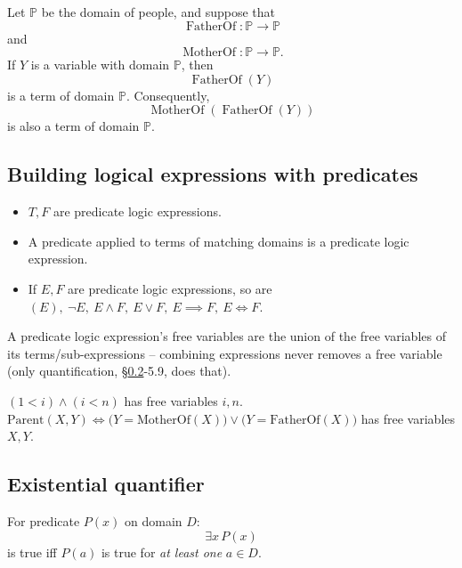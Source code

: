 \documentclass[11pt]{article}
\begin{document}
\begin{example}
Let $\mathbb P$ be the domain of people, and suppose that
\[
\operatorname{FatherOf}:\mathbb P\to\mathbb P
\]
and
\[
\operatorname{MotherOf}:\mathbb P\to\mathbb P.
\]
If $Y$ is a variable with domain $\mathbb P$, then
\[
\operatorname{FatherOf}(Y)
\]
is a term of domain $\mathbb P$. Consequently,
\[
\operatorname{MotherOf}(\operatorname{FatherOf}(Y))
\]
is also a term of domain $\mathbb P$.
\end{example}

\subsection{Building logical expressions with predicates}
\label{sec:5-5}

\begin{definition}
\begin{itemize}
    \item $T, F$ are predicate logic expressions.
    \item A predicate applied to terms of matching domains is a predicate logic expression.
    \item If $E,F$ are predicate logic expressions, so are $(E),\ \neg E,\ E\wedge F,\ E\vee F,\ E\implies F,\ E\iff F$.
\end{itemize}
\end{definition}

\begin{note}
A predicate logic expression's free variables are the union of the free variables of its terms/sub-expressions -- combining expressions never removes a free variable (only quantification, \S\ref{sec:5-6}-5.9, does that).
\end{note}

\begin{example}
$(1<i)\wedge(i<n)$ has free variables $i,n$. $\mathrm{Parent}(X,Y)\iff\big(Y=\mathrm{MotherOf}(X)\big)\vee\big(Y=\mathrm{FatherOf}(X)\big)$ has free variables $X,Y$.
\end{example}

\subsection{Existential quantifier}
\label{sec:5-6}

\begin{definition}
For predicate $P(x)$ on domain $D$:
\[
\exists x\, P(x)
\]
is true iff $P(a)$ is true for \emph{at least one} $a\in D$.
\end{definition}
\end{document}

